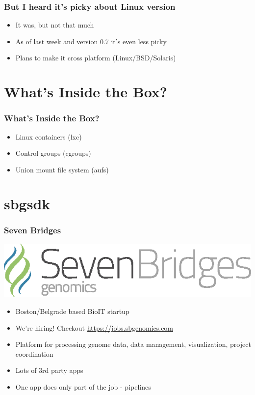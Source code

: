 \documentclass{beamer}
\begin{document}
  \begin{frame}
  	\frametitle{But I heard it's picky about Linux version}
	\begin{itemize}
		\item It was, but not that much
  		\item As of last week and version 0.7 it's even less picky
  		\item Plans to make it cross platform (Linux/BSD/Solaris)
  	\end{itemize}
  \end{frame}
  
  \section{What's Inside the Box?}
  \begin{frame}
  	\frametitle{What's Inside the Box?}
    \begin{itemize}
    	\item Linux containers (lxc)
        \item Control groups (cgroups)
        \item Union mount file system (aufs)
    \end{itemize}
  \end{frame}
    
  \section{sbgsdk}
  \begin{frame}
    \frametitle{Seven Bridges}
    \centering
	    \includegraphics[scale=1]{sbg-logo.eps}
    \begin{itemize}
    	\item Boston/Belgrade based BioIT startup
    	\item We're hiring! Checkout \url{https://jobs.sbgenomics.com}
    	\item Platform for processing genome data, data management, visualization, project coordination
    	\item Lots of 3rd party apps
    	\item One app does only part of the job - pipelines
    \end{itemize}
  \end{frame}
\end{document}
